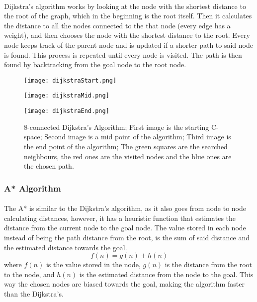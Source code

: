 \paragraph{}Dijkstra’s algorithm works by looking at the node with the shortest distance to the root of the graph, which
in the beginning is the root itself. Then it calculates the distance to all the nodes connected to the that node (every edge
 has a weight), and then chooses the node with the shortest distance to the root. Every node keeps track of the 
parent node and is updated if a shorter path to said node is found. This process is repeated until
every node is visited. The path is then found by backtracking from the goal node to the root node. 
\begin{figure}[htbp]
    \centering
    \begin{minipage}[b]{0.3\textwidth}
        \centering
        \texttt{[image: dijkstraStart.png]} %
    \end{minipage}
    \begin{minipage}[b]{0.3\textwidth}
        \centering
        \texttt{[image: dijkstraMid.png]} %
    \end{minipage}
    \begin{minipage}[b]{0.3\textwidth}
        \centering
        \texttt{[image: dijkstraEnd.png]} %
    \end{minipage}
    \caption{8-connected Dijkstra's Algorithm; First image is the starting C-space; Second image is a mid point of the algorithm; Third image is the end point of the algorithm; The green squares are the searched neighbours, the red ones are the visited nodes and the blue ones are the chosen path.}
    \label{fig:Dijkstra}
\end{figure}
\subsubsection{A* Algorithm}
\label{subsubsec:A*}
\paragraph{}The A* is similar to the Dijkstra's algorithm, as it also goes from node to node calculating distances, however, 
it has a heuristic function that estimates the distance from the current node to the goal node. The value stored in each node 
instead of being the path distance from the root, is the sum of said distance and the estimated distance towards the goal.
\begin{equation}
    f(n) = g(n) + h(n)
\end{equation}
where $f(n)$ is the value stored in the node, $g(n)$ is the distance from the root to the node, and $h(n)$ is the estimated 
distance from the node to the goal. This way the chosen nodes are biased towards the goal, making the algorithm faster than 
the Dijkstra's.

